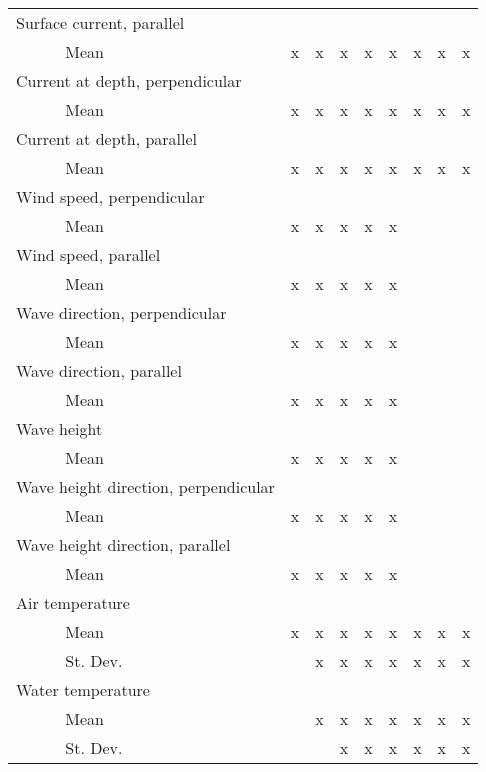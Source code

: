 \documentclass[12pt]{article}
\begin{document}
\begin{table}
{\begin{minipage}{\textwidth}
\begin{tabular}{ll|cccccccc}
        \hline
        \multicolumn{2}{l|}{Surface current, parallel} &&&&&&&& \\
        & Mean & x & x & x & x & x & x & x & x \\
        \hline
        \multicolumn{2}{l|}{Current at depth, perpendicular} &&&&&&&& \\
        & Mean & x & x & x & x & x & x & x & x \\
        \hline
        \multicolumn{2}{l|}{Current at depth, parallel} &&&&&&&& \\
        & Mean & x & x & x & x & x & x & x & x \\
        \hline
        \multicolumn{2}{l|}{Wind speed, perpendicular} &&&&&&&& \\
        & Mean & x & x & x & x & x & & & \\
        \hline
        \multicolumn{2}{l|}{Wind speed, parallel} &&&&&&&& \\
        & Mean & x & x & x & x & x & & & \\
        \hline
        \multicolumn{2}{l|}{Wave direction, perpendicular} &&&&&&&& \\
        & Mean & x & x & x & x & x & & & \\
        \hline
        \multicolumn{2}{l|}{Wave direction, parallel} &&&&&&&& \\
        & Mean & x & x & x & x & x & & & \\
        \hline
        \multicolumn{2}{l|}{Wave height} &&&&&&&& \\
        & Mean & x & x & x & x & x & & & \\
        \hline
        \multicolumn{2}{l|}{Wave height direction, perpendicular} &&&&&&&& \\
        & Mean & x & x & x & x & x & & & \\
        \hline
        \multicolumn{2}{l|}{Wave height direction, parallel} &&&&&&&& \\
        & Mean & x & x & x & x & x & & & \\
        \hline
        \multicolumn{2}{l|}{Air temperature} &&&&&&&& \\
        & Mean & x & x & x & x & x & x & x & x \\
        & St. Dev. & & x & x & x & x & x & x & x \\
        \hline
        \multicolumn{2}{l|}{Water temperature} &&&&&&&& \\
        & Mean & & x & x & x & x & x & x & x \\
        & St. Dev. & & & x & x & x & x & x & x \\

\end{tabular}
\end{minipage}}
\end{table}
\end{document}
